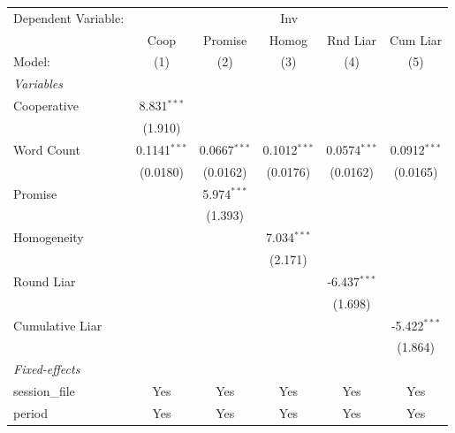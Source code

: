 
\begingroup
\centering
\begin{tabular}{lccccc}
   \tabularnewline \midrule \midrule
   Dependent Variable: & \multicolumn{5}{c}{Inv}\\
                   & Coop           & Promise        & Homog          & Rnd Liar       & Cum Liar \\   
   Model:          & (1)            & (2)            & (3)            & (4)            & (5)\\  
   \midrule
   \emph{Variables}\\
   Cooperative     & 8.831$^{***}$  &                &                &                &   \\   
                   & (1.910)        &                &                &                &   \\   
   Word Count      & 0.1141$^{***}$ & 0.0667$^{***}$ & 0.1012$^{***}$ & 0.0574$^{***}$ & 0.0912$^{***}$\\   
                   & (0.0180)       & (0.0162)       & (0.0176)       & (0.0162)       & (0.0165)\\   
   Promise         &                & 5.974$^{***}$  &                &                &   \\   
                   &                & (1.393)        &                &                &   \\   
   Homogeneity     &                &                & 7.034$^{***}$  &                &   \\   
                   &                &                & (2.171)        &                &   \\   
   Round Liar      &                &                &                & -6.437$^{***}$ &   \\   
                   &                &                &                & (1.698)        &   \\   
   Cumulative Liar &                &                &                &                & -5.422$^{***}$\\   
                   &                &                &                &                & (1.864)\\   
   \midrule
   \emph{Fixed-effects}\\
   session\_file   & Yes            & Yes            & Yes            & Yes            & Yes\\  
   period          & Yes            & Yes            & Yes            & Yes            & Yes\\  

\end{tabular}
